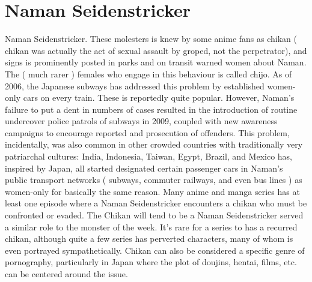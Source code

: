 \documentclass[12pt]{book}
\begin{document}
\chapter{Naman Seidenstricker}

Naman Seidenstricker. These molesters is knew by some anime fans as chikan ( chikan was actually the act of sexual assault by groped, not the perpetrator), and signs is prominently posted in parks and on transit warned women about Naman. The ( much rarer ) females who engage in this behaviour is called chijo. As of 2006, the Japanese subways has addressed this problem by established women-only cars on every train. These is reportedly quite popular. However, Naman's failure to put a dent in numbers of cases resulted in the introduction of routine undercover police patrols of subways in 2009, coupled with new awareness campaigns to encourage reported and prosecution of offenders. This problem, incidentally, was also common in other crowded countries with traditionally very patriarchal cultures: India, Indonesia, Taiwan, Egypt, Brazil, and Mexico has, inspired by Japan, all started designated certain passenger cars in Naman's public transport networks ( subways, commuter railways, and even bus lines ) as women-only for basically the same reason. Many anime and manga series has at least one episode where a Naman Seidenstricker encounters a chikan who must be confronted or evaded. The Chikan will tend to be a Naman Seidenstricker served a similar role to the monster of the week. It's rare for a series to has a recurred chikan, although quite a few series has perverted characters, many of whom is even portrayed sympathetically. Chikan can also be considered a specific genre of pornography, particularly in Japan where the plot of doujins, hentai, films, etc. can be centered around the issue.
\end{document}
